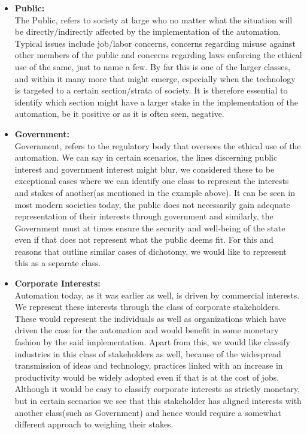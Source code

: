 \begin{itemize}
\item \textbf{Public:}\\
The Public, refers to society at large who no matter what the situation will be directly/indirectly affected by the implementation of the automation. Typical issues include job/labor concerns, concerns regarding misuse against other members of the public and concerns regarding laws enforcing the ethical use of the same, just to name a few. By far this is one of the larger classes, and within it many more that might emerge, especially when the technology is targeted to a certain section/strata of society. It is therefore essential to identify which section might have a larger stake in the implementation of the automation, be it positive or as it is often seen, negative.
\item \textbf{Government:}\\
Government, refers to the regulatory body that oversees the ethical use of the automation. We can say in certain scenarios, the lines discerning public interest and government interest might blur, we considered these to be exceptional cases where we can identify one class to represent the interests and stakes of another(as mentioned in the example above). It can be seen in most modern societies today, the public does not necessarily gain adequate representation of their interests through government and similarly, the Government must at times ensure the security and well-being of the state even if that does not represent what the public deems fit. For this and reasons that outline similar cases of dichotomy, we would like to represent this as a separate class.
\item \textbf{Corporate Interests:}\\
Automation today, as it was earlier as well, is driven by commercial interests. We represent these interests through the class of corporate stakeholders. These would represent the individuals as well as organizations which have driven the case for the automation and would benefit in some monetary fashion by the said implementation. Apart from this, we would like classify industries in this class of stakeholders as well, because of the widespread transmission of ideas and technology, practices linked with an increase in productivity would be widely adopted even if that is at the cost of jobs. Although it would be easy to classify corporate interests as strictly monetary, but in certain scenarios we see that this stakeholder has aligned interests with another class(such as Government) and hence would require a somewhat different approach to weighing their stakes.\\ 
\end{itemize}
